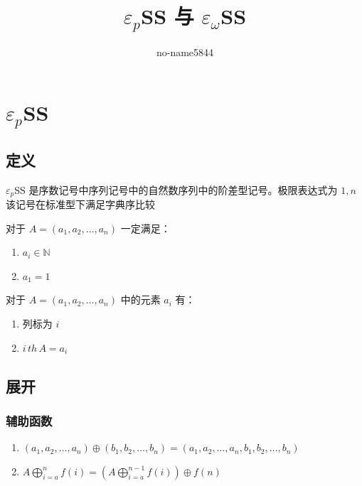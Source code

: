 \documentclass[UTF8]{ctexart}
\title{$\varepsilon_p$SS 与 $\varepsilon_\omega$SS}
\author{no-name5844}
\begin{document}
\maketitle

\section{$\varepsilon_p$SS}
\subsection{定义}
$\varepsilon_p$SS 是序数记号中序列记号中的自然数序列中的阶差型记号。极限表达式为 $1,n$
该记号在标准型下满足字典序比较

对于 $A=(a_1,a_2,\dots,a_n)$ 一定满足：
\begin{enumerate}
  \item $a_i\in\mathbb{N}$
  \item $a_1=1$
\end{enumerate}
对于 $A=(a_1,a_2,\dots,a_n)$ 中的元素 $a_i$ 有：
\begin{enumerate}
  \item 列标为 $i$
  \item $i\,th\,A=a_i$
\end{enumerate}

\subsection{展开}
\subsubsection{辅助函数}
\begin{enumerate}
  \item $(a_1,a_2,\dots,a_n)\oplus(b_1,b_2,\dots,b_n)=(a_1,a_2,\dots,a_n,b_1,b_2,\dots,b_n)$
  \item $A\bigoplus^n_{i=a}f(i)=(A\bigoplus^{n-1}_{i=a}f(i))\oplus f(n)$
\end{enumerate}
\end{document}
